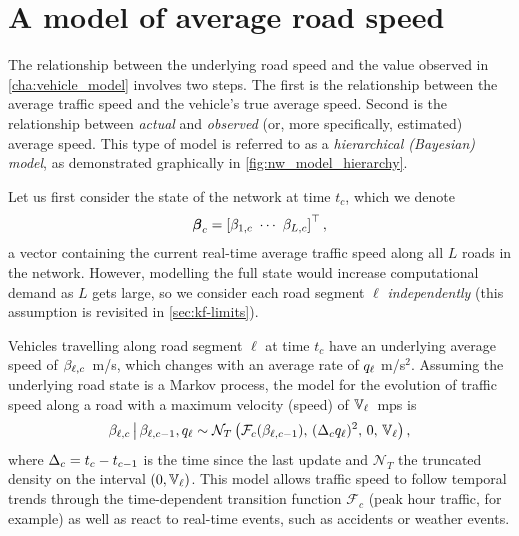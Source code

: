 \section{A model of average road speed}
\label{sec:nw_model}


The relationship between the underlying road speed and the value observed in \cref{cha:vehicle_model} involves two steps. The first is the relationship between the average traffic speed and the vehicle's true average speed. Second is the relationship between \emph{actual} and \emph{observed} (or, more specifically, estimated) average speed. This type of model is referred to as a \emph{hierarchical (Bayesian) model}, as demonstrated graphically in \cref{fig:nw_model_hierarchy}.


Let us first consider the state of the network at time $t_c$, which we denote
\begin{equation}\label{eq:nw_state}
\boldsymbol{\beta}_c =
\left[\beta_{1,c}\ \cdots\ \beta_{L,c}\right]^\top,
\end{equation}
a vector containing the current real-time average traffic speed along all $L$ roads in the network. However, modelling the full state would increase computational demand as $L$ gets large, so we consider each road segment $\ell$ \emph{independently} (this assumption is revisited in \cref{sec:kf-limits}).


Vehicles travelling along road segment $\ell$ at time $t_c$ have an underlying average speed of $\beta_{\ell,c}$~m/s, which changes with an average rate of $q_\ell$ m/s$^2$. Assuming the underlying road state is a Markov process, the model for the evolution of traffic speed along a road with a maximum velocity (speed) of $\mathbb{V}_\ell$~\gls{mps} is
\begin{equation}\label{eq:nw_state_markov}
\beta_{\ell,c} \,\big|\, \beta_{\ell,c-1}, q_\ell \sim
\mathcal{N}_T\left(\mathcal{F}_c(\beta_{\ell,c-1}),\, (\Delta_c q_\ell)^2,\, 0,\, \mathbb{V}_\ell\right),
\end{equation}
where $\Delta_c = t_c - t_{c-1}$ is the time since the last update and $\mathcal{N}_T$ the truncated \normal{} density on the interval $(0,\mathbb{V}_\ell)$. This model allows traffic speed to follow temporal trends through the time-dependent transition function $\mathcal{F}_c$ (peak hour traffic, for example) as well as react to real-time events, such as accidents or weather events.


